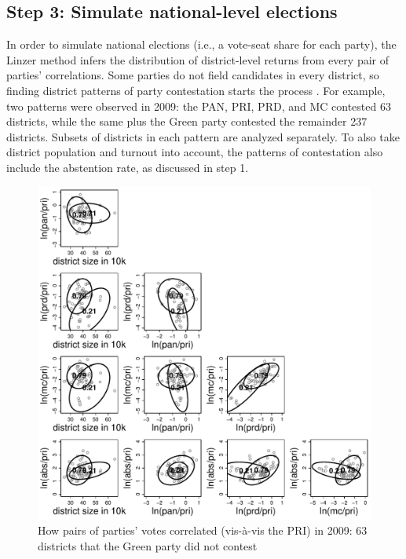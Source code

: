 \documentclass[letter,12pt]{article}
\begin{document}
\subsection*{Step 3: Simulate national-level elections}

In order to simulate national elections (i.e., a vote-seat share for each party), the Linzer method infers the distribution of district-level returns from every pair of parties' correlations. Some parties do not field candidates in every district, so finding district patterns of party contestation starts the process \citep[][:405]{linzerSeatVoteElasticity2012}. For example, two patterns were observed in 2009: the PAN, PRI, PRD, and MC contested 63 districts, while the same plus the Green party contested the remainder 237 districts. Subsets of districts in each pattern are analyzed separately. To also take district population and turnout into account, the patterns of contestation also include the abstention rate, as discussed in step 1. 

\begin{figure}
\centering 
  \includegraphics[width=.8\columnwidth]{linzerCorrelat2009.pdf} 
  \caption{How pairs of parties' votes correlated (vis-\`a-vis the PRI) in 2009: 63 districts that the Green party did not contest}\label{F:linzerCorr}
\end{figure}
\end{document}
